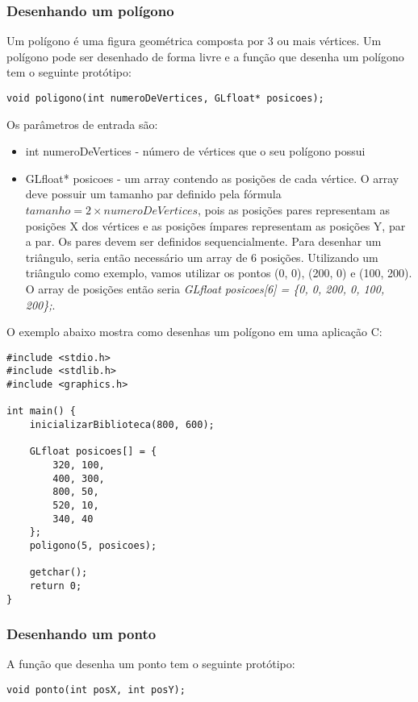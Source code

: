 \documentclass[12pt, %
openright,
oneside, %
a4paper,    %
brazil]{facom-ufu-abntex2}
\begin{document}
\subsubsection{Desenhando um polígono}
Um polígono é uma figura geométrica composta por 3 ou mais vértices. Um polígono pode ser desenhado de forma livre e a função que desenha um polígono tem o seguinte protótipo:

\begin{verbatim}
void poligono(int numeroDeVertices, GLfloat* posicoes);
\end{verbatim}

Os parâmetros de entrada são:

\begin{itemize}
    \item int numeroDeVertices - número de vértices que o seu polígono possui
    \item GLfloat* posicoes - um array contendo as posições de cada vértice. O array deve possuir um tamanho par definido pela fórmula \(tamanho = 2 \times numeroDeVertices \), pois as posições pares representam as posições X dos vértices e as posições ímpares representam as posições Y, par a par. Os pares devem ser definidos sequencialmente. Para desenhar um triângulo, seria então necessário um array de 6 posições. Utilizando um triângulo como exemplo, vamos utilizar os pontos (0, 0), (200, 0) e (100, 200). O array de posições então seria \textit{GLfloat posicoes[6] = \{0, 0, 200, 0, 100, 200\};}.
\end{itemize}

O exemplo abaixo mostra como desenhas um polígono em uma aplicação C:

\begin{verbatim}
#include <stdio.h>
#include <stdlib.h>
#include <graphics.h>

int main() {
    inicializarBiblioteca(800, 600);

    GLfloat posicoes[] = {
        320, 100,
        400, 300,
        800, 50,
        520, 10,
        340, 40
    };
    poligono(5, posicoes);

    getchar();
    return 0;
}
\end{verbatim}

\subsubsection{Desenhando um ponto}
A função que desenha um ponto tem o seguinte protótipo:

\begin{verbatim}
void ponto(int posX, int posY);
\end{verbatim}
\end{document}
